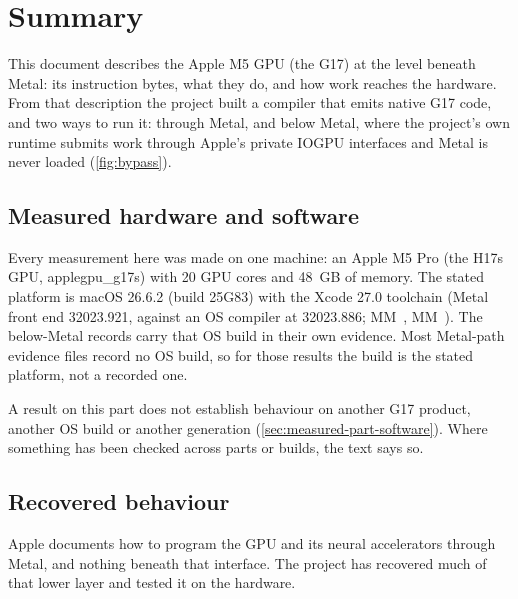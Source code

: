 \chapter{Summary}\label{ch:work-brief}

This document describes the Apple M5 GPU (the G17) at the level beneath Metal: its instruction bytes, what
they do, and how work reaches the hardware. From that description the project built a compiler that emits native G17
code, and two ways to run it: through Metal, and below Metal, where the project's own runtime submits work through Apple's
private IOGPU interfaces and Metal is never loaded (\cref{fig:bypass}).

\section{Measured hardware and software}\label{sec:part-software}

Every measurement here was made on one machine: an Apple M5 Pro (the H17s GPU, applegpu\_g17s) with 20 GPU cores and
48~GB of memory. The stated platform is macOS 26.6.2 (build 25G83) with the Xcode 27.0 toolchain (Metal front end
32023.921, against an OS compiler at 32023.886; MM~, MM~). The below-Metal records carry that OS build in their
own evidence. Most Metal-path evidence files record no OS build, so for those results the build is the stated
platform, not a recorded one.

A result on this part does not establish behaviour on another G17 product, another OS build or another generation
(\cref{sec:measured-part-software}). Where something has been checked across parts or builds, the text says so.

\section{Recovered behaviour}\label{sec:has-been-recovered}

Apple documents how to program the GPU and its neural accelerators through Metal, and nothing beneath that interface.
The project has recovered much of that lower layer and tested it on the hardware.

